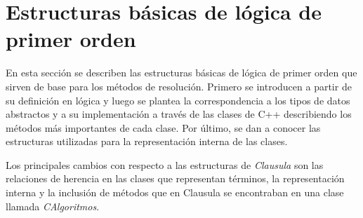 \documentclass[a4paper,12pt]{article}
\begin{document}
\section{Estructuras básicas de lógica de primer orden}
En esta sección se describen las estructuras básicas de lógica de primer orden que sirven de base para los métodos de resolución.
Primero se introducen a partir de su definición en lógica y luego se plantea la correspondencia a los tipos de datos abstractos
y a su implementación a través de las clases de C++ describiendo los métodos más importantes de cada clase. 
Por último, se dan a conocer las estructuras utilizadas para la representación interna de las clases.

Los principales cambios con respecto a las estructuras de \emph{Clausula} son las relaciones de herencia
en las clases que representan términos, la representación interna y la inclusión de métodos que en Clausula
se encontraban en una clase llamada \emph{CAlgoritmos}.
\end{document}
